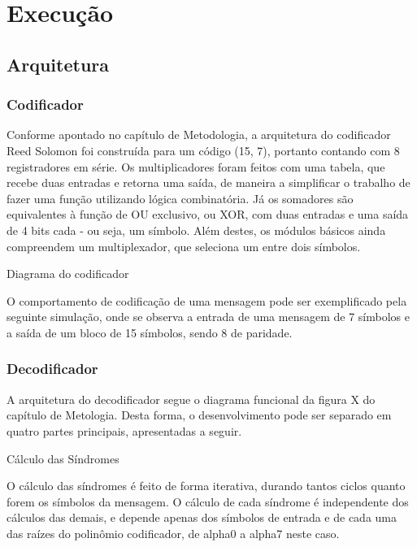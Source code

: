 	\chapter{Execução}\label{cap-execucao}
	
	\section{Arquitetura}
	
	\subsection{Codificador}
	
	Conforme apontado no capítulo de Metodologia, a arquitetura do codificador Reed Solomon foi construída para um código (15, 7), portanto contando com 8 registradores em série. Os multiplicadores foram feitos com uma tabela,  que recebe duas entradas e retorna uma saída, de maneira a simplificar o trabalho de fazer uma função utilizando lógica combinatória. Já os somadores são equivalentes à função de OU exclusivo, ou XOR, com duas entradas e uma saída de 4 bits cada - ou seja, um símbolo. Além destes, os módulos básicos ainda compreendem um multiplexador, que seleciona um entre dois símbolos.
	
	Diagrama do codificador
	
	O comportamento de codificação de uma mensagem pode ser exemplificado pela seguinte simulação, onde se observa a entrada de uma mensagem de 7 símbolos e a saída de um bloco de 15 símbolos, sendo 8 de paridade.	
	
	 
	\subsection{Decodificador}
	
	A arquitetura do decodificador segue o diagrama funcional da figura X do capítulo de Metologia. Desta forma, o desenvolvimento pode ser separado em quatro partes principais, apresentadas a seguir.
	
	Cálculo das Síndromes
	
	O cálculo das síndromes é feito de forma iterativa, durando tantos ciclos quanto forem os símbolos da mensagem. O cálculo de cada síndrome é independente dos cálculos das demais, e depende apenas dos símbolos de entrada e de cada uma das raízes do polinômio codificador, de alpha0 a alpha7 neste caso.
	
